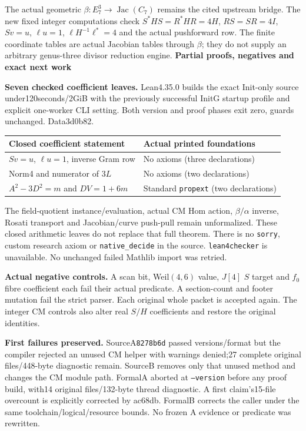 \documentclass[10pt,a4paper]{article}
\begin{document}
The actual geometric $\beta:E_7^3\to\operatorname{Jac}(C_7)$ remains
the cited upstream bridge. The new fixed integer computations check
$S^*HS=R^*HR=4H$, $RS=SR=4I$, $Sv=u$, $\ell u=1$,
$\ell H^{-1}\ell^*=4$ and the actual pushforward row. The finite
coordinate tables are actual Jacobian tables through $\beta$; they do
not supply an arbitrary genus-three divisor reduction engine.
\newpage
{\Large\bfseries Partial proofs, negatives and exact next work}\par
\textbf{Seven checked coefficient leaves.} Lean4.35.0 builds the exact
Init-only source under120seconds/2GiB with the previously successful
InitG startup profile and explicit one-worker CLI setting. Both version
and proof phases exit zero, guards unchanged. Data3d0b82.

\begin{center}
\begin{tabular}{p{76mm}p{83mm}}
\toprule
Closed coefficient statement & Actual printed foundations\\
\midrule
$Sv=u$, $\ell u=1$, inverse Gram row & No axioms (three declarations)\\
Norm4 and numerator of $3L$ & No axioms (two declarations)\\
$A^2-3D^2=m$ and $DV=1+6m$ & Standard \texttt{propext} (two declarations)\\
\bottomrule
\end{tabular}
\end{center}

The field-quotient instance/evaluation, actual CM Hom action,
$\beta/\alpha$ inverse, Rosati transport and Jacobian/curve push-pull
remain unformalized. These closed arithmetic leaves do not replace that
full theorem. There is no \texttt{sorry}, custom research axiom or
\texttt{native\_decide} in the source. \texttt{lean4checker} is unavailable.
No unchanged failed Mathlib import was retried.

\textbf{Actual negative controls.} A scan bit, Weil$(4,6)$ value,
$J[4]$ $S$ target and $f_0$ fibre coefficient each fail their actual
predicate. A section-count and footer mutation fail the strict parser.
Each original whole packet is accepted again. The integer CM controls
also alter real $S/H$ coefficients and restore the original identities.

\textbf{First failures preserved.} SourceA\texttt{8278b6d} passed
versions/format but the compiler rejected an unused CM helper with
warnings denied;27 complete original files/448-byte diagnostic remain.
SourceB removes only that unused method and changes the CM module path.
FormalA aborted at \texttt{--version} before any proof build, with14
original files/132-byte thread diagnostic. A first claim's15-file
overcount is explicitly corrected by ac68db. FormalB corrects the caller
under the same toolchain/logical/resource bounds. No frozen A evidence
or predicate was rewritten.
\end{document}
